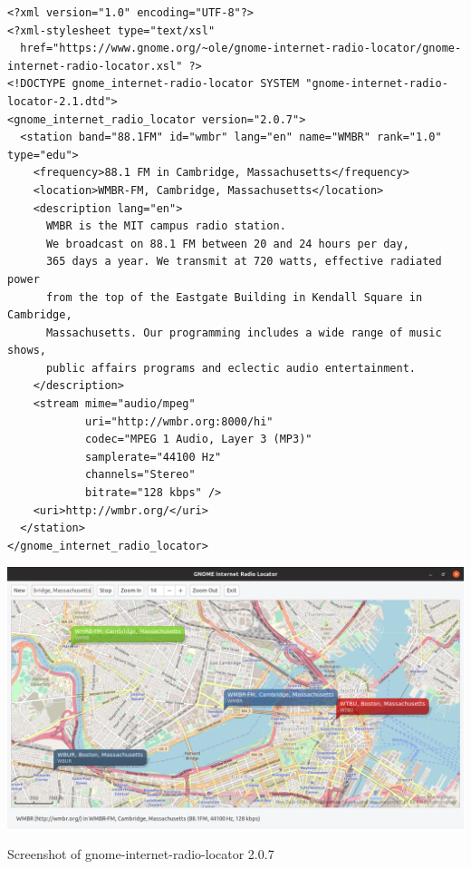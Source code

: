 \documentclass[20pt,landscape]{foils}
\begin{document}
\begin{tiny}
\begin{verbatim}
<?xml version="1.0" encoding="UTF-8"?>
<?xml-stylesheet type="text/xsl"
  href="https://www.gnome.org/~ole/gnome-internet-radio-locator/gnome-internet-radio-locator.xsl" ?>
<!DOCTYPE gnome_internet-radio-locator SYSTEM "gnome-internet-radio-locator-2.1.dtd">
<gnome_internet_radio_locator version="2.0.7">
  <station band="88.1FM" id="wmbr" lang="en" name="WMBR" rank="1.0" type="edu">
    <frequency>88.1 FM in Cambridge, Massachusetts</frequency>
    <location>WMBR-FM, Cambridge, Massachusetts</location>
    <description lang="en">
      WMBR is the MIT campus radio station.
      We broadcast on 88.1 FM between 20 and 24 hours per day, 
      365 days a year. We transmit at 720 watts, effective radiated power 
      from the top of the Eastgate Building in Kendall Square in Cambridge, 
      Massachusetts. Our programming includes a wide range of music shows, 
      public affairs programs and eclectic audio entertainment.
    </description>
    <stream mime="audio/mpeg"
            uri="http://wmbr.org:8000/hi"
            codec="MPEG 1 Audio, Layer 3 (MP3)"
            samplerate="44100 Hz"
            channels="Stereo"
            bitrate="128 kbps" />
    <uri>http://wmbr.org/</uri>
  </station>
</gnome_internet_radio_locator>
\end{verbatim}
\end{tiny}


\begin{center}

  \colorbox{white}{\includegraphics[width=0.6\hsize]{../data/screenshot.png}}

  {\blueem Screenshot of gnome-internet-radio-locator 2.0.7}

\end{center}

\end{document}
